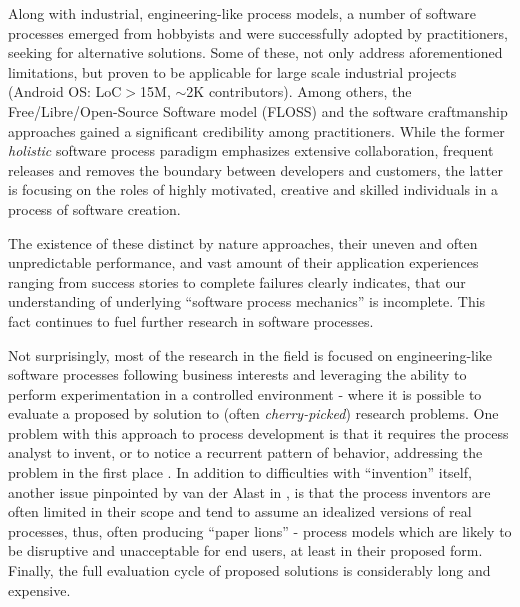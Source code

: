 Along with industrial, engineering-like process models, a number of software processes 
emerged from hobbyists and were successfully adopted by practitioners, seeking for alternative solutions.
Some of these, not only address aforementioned limitations, but proven to be applicable for large scale 
industrial projects (Android OS: LoC$>$15M, $\sim$2K contributors). 
Among others, the Free/Libre/Open-Source Software model (FLOSS) and the software craftmanship 
approaches gained a significant credibility among practitioners.
While the former \textit{holistic} software process paradigm emphasizes extensive collaboration, 
frequent releases and removes the boundary between developers and customers, the latter is focusing 
on the roles of highly motivated, creative and skilled individuals in a process of software creation. 

The existence of these distinct by nature approaches, their uneven and often unpredictable performance, 
and vast amount of their application experiences ranging from success stories to complete failures clearly 
indicates, that our understanding of underlying ``software process mechanics'' is incomplete. This
fact continues to fuel further research in software processes.

Not surprisingly, most of the research in the field is focused on engineering-like software processes following business 
interests and leveraging the ability to perform experimentation in a controlled environment - where it is possible to 
evaluate a proposed by solution to (often \textit{cherry-picked}) research problems. 
One problem with this approach to process development is that it requires the process analyst to invent, or to notice 
a recurrent pattern of behavior, addressing the problem in the first place \cite{citeulike:5043104}. 
In addition to difficulties with ``invention'' itself, another issue pinpointed by van der Alast in \cite{citeulike:9758924}, 
is that the process inventors are often limited in their scope and tend to assume an idealized versions of real processes, 
thus, often producing ``paper lions'' - process models which are likely to be disruptive and unacceptable for end users, 
at least in their proposed form. Finally, the full evaluation cycle of proposed solutions is considerably long and expensive.


